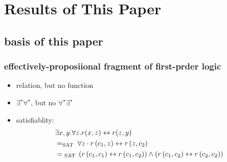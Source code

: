 \section{Results of This Paper}
\subsection{basis of this paper}
\begin{frame}
    \frametitle{effectively-proposiional fragment of first-prder logic}
    \begin{itemize}
        \item relation, but no function
        \item $\exists^{\star} \forall ^{\star}$, but no $\forall^{\star} \exists ^{\star}$
        \item satisfiablity:
        \begin{align}
            &\exists x, y . \forall z . r(x, z) \leftrightarrow r(z, y) \\\notag & = _{\text {SAT }} \forall z \cdot r\left(c_{1}, z\right) \leftrightarrow r\left(z, c_{2}\right) \\ & = { }_{\text {SAT }}\left(r\left(c_{1}, c_{1}\right) \leftrightarrow r\left(c_{1}, c_{2}\right)\right) \wedge\left(r\left(c_{1}, c_{2}\right) \leftrightarrow r\left(c_{2}, c_{2}\right)\right)
        \end{align}
    \end{itemize}
\end{frame}
